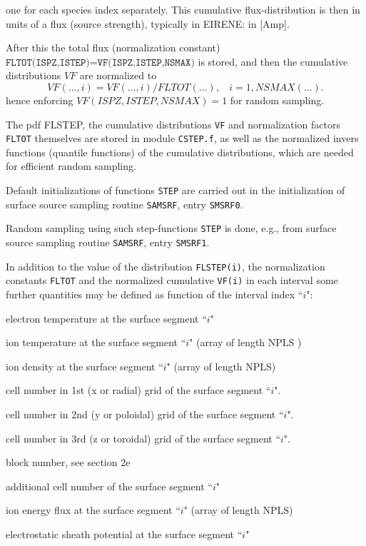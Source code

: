 one for each species index separately. This cumulative flux-distribution is then in units of a flux (source strength), typically in EIRENE: in [Amp].

After this the total flux (normalization constant) $\texttt{FLTOT(ISPZ,ISTEP)=VF(ISPZ,ISTEP,NSMAX)}$ is stored,
and then the cumulative distributions $VF$ are normalized
to
\begin{equation}\nonumber
VF(...,i) = VF(...,i)/FLTOT(...),  \ \ \ \ i=1,NSMAX(...).
\end{equation}
hence enforcing $VF(ISPZ,ISTEP,NSMAX) = 1$ for random sampling.


The pdf FLSTEP, the cumulative distributions \texttt{VF}
and normalization factors \texttt{FLTOT} themselves
are stored in module \texttt{CSTEP.f},
as well as the normalized invers functions
(quantile functions) of the cumulative distributions,
which are needed for efficient random sampling.



Default initializations of functions \texttt{STEP} are carried out in the
initialization of surface source sampling routine \texttt{SAMSRF}, entry
\texttt{SMSRF0}.

Random sampling using such step-functions \texttt{STEP} is done, e.g., from
surface source sampling routine \texttt{SAMSRF}, entry \texttt{SMSRF1}.

In addition to the value of the distribution
\texttt{FLSTEP(i)}, the normalization constants \texttt{FLTOT} and the normalized cumulative \texttt{VF(i)} in each interval
some further quantities may be defined as function of the interval index
``$i$":

\begin{list}{ }{}
\item[{TESTEP }]
electron temperature at the surface segment ``$i$"
\item[{TISTEP }]
ion temperature at the surface segment ``$i$" (array of length NPLS )
\item[{DISTEP }]
ion density at the surface segment ``$i$" (array of length NPLS)
\item[{IRSTEP }]
cell number in 1st (x or radial) grid of the surface segment ``$i$".
\item[{IPSTEP }]
cell number in 2nd (y or poloidal) grid of the surface segment ``$i$".
\item[{ITSTEP }]
cell number in 3rd (z or toroidal) grid of the surface segment ``$i$".
\item[{IBSTEP }]
block number, see section 2e
\item[{IASTEP }]
additional cell number of the surface segment ``$i$"
\item[{ELSTEP }]
ion energy flux at the surface segment ``$i$" (array of length NPLS)
\item[{SHSTEP }]
electrostatic sheath potential at the  surface segment ``$i$"
\end{list}

